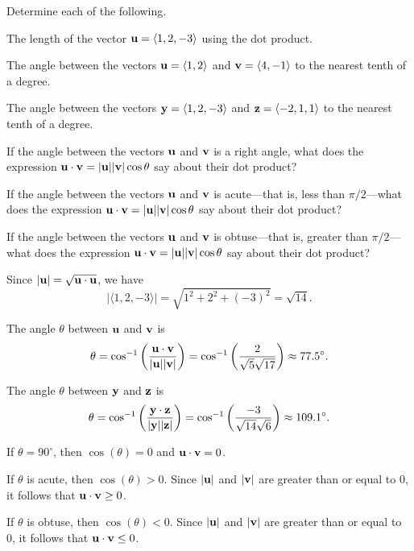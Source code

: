 \begin{activity} \label{A:9.3.2.a}  Determine each of the following.
  \ba
  \item The length of the vector $\mathbf{u}=\langle 1,2,-3\rangle$ using the
    dot product.  
\item The angle between the vectors $\mathbf{u} =\langle 1, 2 \rangle$ and
  $\mathbf{v} = \langle 4, -1 \rangle$ to the nearest tenth of a degree. 

\item The angle between the vectors $\mathbf{y} =\langle 1, 2, -3 \rangle$
  and $\mathbf{z} = \langle -2, 1, 1 \rangle$ to the nearest tenth of a
  degree. 

\item If the angle between the vectors $\mathbf{u}$ and $\mathbf{v}$ is a right
  angle, what does the expression $\mathbf{u}\cdot\mathbf{v}=|\mathbf{u}||\mathbf{v}|\cos\theta$
  say about their dot product?

\item If the angle between the vectors $\mathbf{u}$ and $\mathbf{v}$ is acute---that
  is, less than $\pi/2$---what does the
  expression $\mathbf{u}\cdot\mathbf{v}=|\mathbf{u}||\mathbf{v}|\cos\theta$ say about their dot
  product?

\item If the angle between the vectors $\mathbf{u}$ and $\mathbf{v}$ is
  obtuse---that is, greater than $\pi/2$---what does the expression
  $\mathbf{u}\cdot\mathbf{v}=|\mathbf{u}||\mathbf{v}|\cos\theta$ say about their dot product?

  \ea
\end{activity}

\begin{activitySolution}
	\ba
	\item Since $|\mathbf{u}| = \sqrt{\mathbf{u} \cdot \mathbf{u}}$, we have 
\[|\langle 1,2,-3\rangle| = \sqrt{1^2+2^2+(-3)^2} = \sqrt{14}.\]
	
	\item The angle $\theta$ between $\mathbf{u}$ and $\mathbf{v}$ is 
\[\theta = \cos^{-1}\left(\frac{\mathbf{u}\cdot\mathbf{v}}{|\mathbf{u}||\mathbf{v}|}\right) = \cos^{-1}\left(\frac{2}{\sqrt{5}\sqrt{17}}\right) \approx 77.5^{\circ}.\]

	\item The angle $\theta$ between $\mathbf{y}$ and $\mathbf{z}$ is 
\[\theta = \cos^{-1}\left(\frac{\mathbf{y}\cdot\mathbf{z}}{|\mathbf{y}||\mathbf{z}|}\right) = \cos^{-1}\left(\frac{-3}{\sqrt{14}\sqrt{6}}\right) \approx 109.1^{\circ}.\]

\item If $\theta = 90^{\circ}$, then $\cos(\theta) = 0$ and $\mathbf{u} \cdot \mathbf{v} = 0$. 

\item If $\theta$ is acute, then $\cos(\theta) > 0$. Since $|\mathbf{u}|$ and $|\mathbf{v}|$ are greater than or equal to 0, it follows that $\mathbf{u} \cdot \mathbf{v} \geq 0$.

\item If $\theta$ is obtuse, then $\cos(\theta) < 0$. Since $|\mathbf{u}|$ and $|\mathbf{v}|$ are greater than or equal to 0, it follows that $\mathbf{u} \cdot \mathbf{v} \leq 0$.
	\ea
\end{activitySolution}


\aftera

